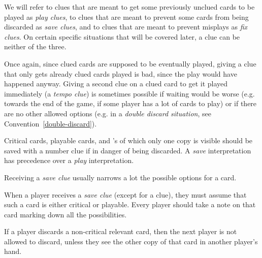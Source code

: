 We will refer to clues that are meant to get some previously unclued cards to be played as \emph{play clues}, to clues that are meant to prevent some cards from being discarded as \emph{save clues}, and to clues that are meant to prevent misplays as \emph{fix clues}. On certain specific situations that will be covered later, a clue can be neither of the three.

Once again, since clued cards are supposed to be eventually played, giving a clue that only gets already clued cards played is bad, since the play would have happened anyway. Giving a second clue on a clued card to get it played immediately (a \emph{tempo clue}) is sometimes possible if waiting would be worse (e.g. towards the end of the game, if some player has a lot of cards to play) or if there are no other allowed options (e.g. in a \emph{double discard situation}, see Convention~\ref{double-discard}).

\begin{convention}
	Critical cards, playable cards, and 's of which only one copy is visible should be saved with a number clue if in danger of being discarded. A \emph{save} interpretation has precedence over a \emph{play} interpretation.
\end{convention}

Receiving a \emph{save clue} usually narrows a lot the possible options for a card.

\begin{convention}
	\label{save-notes}
	When a player receives a \emph{save clue} (except for a  clue), they must assume that such a card is either critical or playable. Every player should take a note on that card marking down all the possibilities.
\end{convention}


\begin{convention}
	\label{double-discard}
	If a player discards a non-critical relevant card, then the next player is not allowed to discard, unless they see the other copy of that card in another player's hand.
\end{convention}

